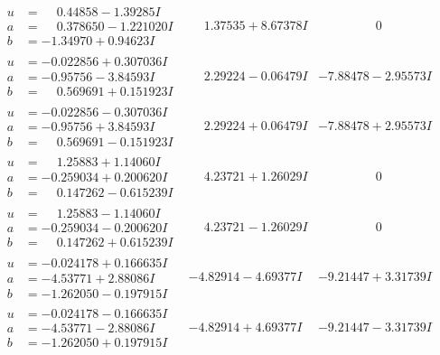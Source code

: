 \documentclass[1p]{elsarticle_modified}
\theoremstyle{definition}
\begin{document}
$$\begin{array}{c|c|c}
\begin{aligned}
u &= \phantom{-}0.44858 - 1.39285 I \\
a &= \phantom{-}0.378650 - 1.221020 I \\
b &= -1.34970 + 0.94623 I\end{aligned}
 & \phantom{-}1.37535 + 8.67378 I & \phantom{-0.000000 } 0 \\ \hline\begin{aligned}
u &= -0.022856 + 0.307036 I \\
a &= -0.95756 - 3.84593 I \\
b &= \phantom{-}0.569691 + 0.151923 I\end{aligned}
 & \phantom{-}2.29224 - 0.06479 I & -7.88478 - 2.95573 I \\ \hline\begin{aligned}
u &= -0.022856 - 0.307036 I \\
a &= -0.95756 + 3.84593 I \\
b &= \phantom{-}0.569691 - 0.151923 I\end{aligned}
 & \phantom{-}2.29224 + 0.06479 I & -7.88478 + 2.95573 I \\ \hline\begin{aligned}
u &= \phantom{-}1.25883 + 1.14060 I \\
a &= -0.259034 + 0.200620 I \\
b &= \phantom{-}0.147262 - 0.615239 I\end{aligned}
 & \phantom{-}4.23721 + 1.26029 I & \phantom{-0.000000 } 0 \\ \hline\begin{aligned}
u &= \phantom{-}1.25883 - 1.14060 I \\
a &= -0.259034 - 0.200620 I \\
b &= \phantom{-}0.147262 + 0.615239 I\end{aligned}
 & \phantom{-}4.23721 - 1.26029 I & \phantom{-0.000000 } 0 \\ \hline\begin{aligned}
u &= -0.024178 + 0.166635 I \\
a &= -4.53771 + 2.88086 I \\
b &= -1.262050 - 0.197915 I\end{aligned}
 & -4.82914 - 4.69377 I & -9.21447 + 3.31739 I \\ \hline\begin{aligned}
u &= -0.024178 - 0.166635 I \\
a &= -4.53771 - 2.88086 I \\
b &= -1.262050 + 0.197915 I\end{aligned}
 & -4.82914 + 4.69377 I & -9.21447 - 3.31739 I \\ \hline\begin{aligned}

\end{aligned}
\end{array}$$
\end{document}
